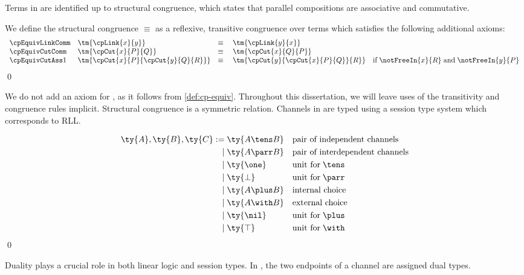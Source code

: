 \documentclass[UKenglish]{llncs}
\begin{document}
Terms in \cp are identified up to structural congruence, which states that
parallel compositions  are associative and commutative.
\begin{definition}\label{def:cp-equiv}
  We define the structural congruence $\equiv$ as a reflexive, transitive
  congruence over terms which satisfies the following additional axioms:
  \[
    \begin{array}{llll}
      \cpEquivLinkComm
      & \tm{\cpLink{x}{y}}
      & \equiv \;
      & \tm{\cpLink{y}{x}}
      \\
      \cpEquivCutComm
      & \tm{\cpCut{x}{P}{Q}}
      & \equiv \;
      & \tm{\cpCut{x}{Q}{P}}
      \\
      \cpEquivCutAss1
      & \tm{\cpCut{x}{P}{\cpCut{y}{Q}{R}}}
      & \equiv \;
      & \tm{\cpCut{y}{\cpCut{x}{P}{Q}}{R}}
        \quad \text{if} \; \notFreeIn{x}{R} \; \text{and} \; \notFreeIn{y}{P}
    \end{array}
  \]
  \qed
\end{definition}
We do not add an axiom for , as it follows from
\cref{def:cp-equiv}.
Throughout this dissertation, we will leave uses of the transitivity and
congruence rules implicit.
Structural congruence is a symmetric relation.
%
Channels in \cp are typed using a session type system which corresponds to RLL.
\begin{definition}[Types]\label{def:cp-types}
  \[\!
    \begin{aligned}
      \ty{A}, \ty{B}, \ty{C}
           :=& \; \ty{A \tens B} &&\text{pair of independent channels}
      \\ \mid& \; \ty{A \parr B} &&\text{pair of interdependent channels}
      \\ \mid& \; \ty{\one}      &&\text{unit for} \; {\tens}
      \\ \mid& \; \ty{\bot}      &&\text{unit for} \; {\parr}
      \\ \mid& \; \ty{A \plus B} &&\text{internal choice}
      \\ \mid& \; \ty{A \with B} &&\text{external choice}
      \\ \mid& \; \ty{\nil}      &&\text{unit for} \; {\plus}
      \\ \mid& \; \ty{\top}      &&\text{unit for} \; {\with}
    \end{aligned}
  \]  
  \qed
\end{definition}
Duality plays a crucial role in both linear logic and session types.
In \cp, the two endpoints of a channel are assigned dual types.
\end{document}
